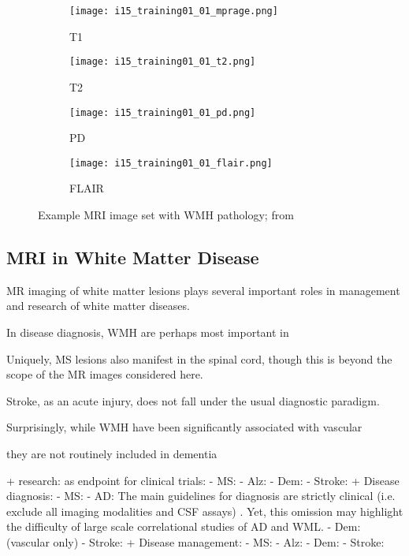 \begin{figure}
  \centering
  \begin{subfigure}{0.24\textwidth}\texttt{[image: i15\_training01\_01\_mprage.png]}\caption{T1}  \end{subfigure}
  \begin{subfigure}{0.24\textwidth}\texttt{[image: i15\_training01\_01\_t2.png]}\caption{T2}      \end{subfigure}
  \begin{subfigure}{0.24\textwidth}\texttt{[image: i15\_training01\_01\_pd.png]}\caption{PD}      \end{subfigure}
  \begin{subfigure}{0.24\textwidth}\texttt{[image: i15\_training01\_01\_flair.png]}\caption{FLAIR}\end{subfigure}
  \caption{Example MRI image set with WMH pathology; from \cite{WMHSEG2017}}
  \label{fig:4mri}
\end{figure}
\subsection{MRI in White Matter Disease}
MR imaging of white matter lesions plays several important roles in management and research of white matter diseases. 
\par
In disease diagnosis, WMH are perhaps most important in 



Uniquely, MS lesions also manifest in the spinal cord, though this is beyond the scope of the MR images considered here.

Stroke, as an acute injury, does not fall under the usual diagnostic paradigm. 

Surprisingly, while WMH have been significantly associated with vascular 

they are not routinely included in dementia 

\cite{Debette2010}




+ research: as endpoint for clinical trials:
  - MS:
  - Alz:
  - Dem:
  - Stroke:
+ Disease diagnosis:
  - MS: \cite{Polman2011}
  - AD: The main guidelines for diagnosis are strictly clinical (i.e. exclude all imaging modalities and CSF assays) \cite{McKhann2011}.
  Yet, this omission may highlight the difficulty of large scale correlational studies of AD and WML.
  - Dem: (vascular only) 
  - Stroke:
+ Disease management:
  - MS:
  - Alz:
  - Dem:
  - Stroke:


